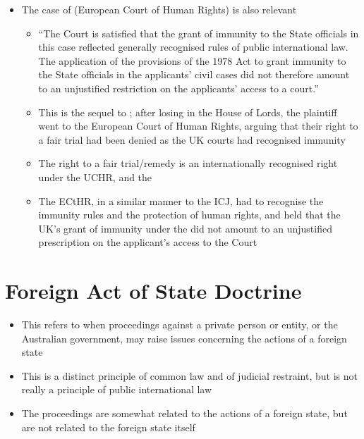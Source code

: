 \begin{itemize}
    \item The case of  (European Court of Human Rights) is also relevant
    \begin{itemize}
        \item ``The Court is satisfied that the grant of immunity to the State officials in this case reflected generally recognised rules of public international law. The application of the provisions of the 1978 Act to grant immunity to the State officials in the applicants' civil cases did not therefore amount to an unjustified restriction on the applicants' access to a court.''
        \item This is the sequel to ; after losing in the House of Lords, the plaintiff went to the European Court of Human Rights, arguing that their right to a fair trial had been denied as the UK courts had recognised immunity
        \item The right to a fair trial/remedy is an internationally recognised right under the UCHR, and the 
        \item The ECtHR, in a similar manner to the ICJ, had to recognise the immunity rules and the protection of human rights, and held that the UK's grant of immunity under the  did not amount to an unjustified prescription on the applicant's access to the Court 
    \end{itemize}
\end{itemize}

\section{Foreign Act of State Doctrine}
\begin{itemize}
    \item This refers to when proceedings against a private person or entity, or the Australian government, may raise issues concerning the actions of a foreign state
    \item This is a distinct principle of common law and of judicial restraint, but is not really a principle of public international law
    \item The proceedings are somewhat related to the actions of a foreign state, but are not related to the foreign state itself
\end{itemize}

